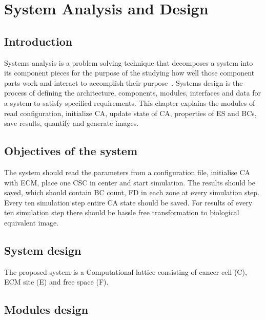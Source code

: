 \chapter{System Analysis and Design}
\section{Introduction}
Systems analysis is a problem solving technique that decomposes a system into its component pieces 
for the purpose of the studying how well those component parts work and interact to accomplish their purpose~\cite{SystemsAnalysisandDesign}.
Systems design is the process of defining the architecture, components, modules, interfaces and data for a system to satisfy specified requirements. 
This chapter explains the modules of read configuration, initialize CA, update state of CA, properties of ES and BCs, save results, quantify and generate images.

\section{Objectives of the system}
The system should read the parameters from a configuration file, initialise CA with ECM, place one CSC in center and start simulation. 
The results should be saved, which should contain BC count, FD in each zone at every simulation step. 
Every ten simulation step entire CA state should be saved.
For results of every ten simulation step there should be hassle free transformation to biological equivalent image.

\section{System design}

The proposed system is a Computational lattice consisting of cancer cell (C), 
ECM site (E) and free space (F). 

\section{Modules design}

